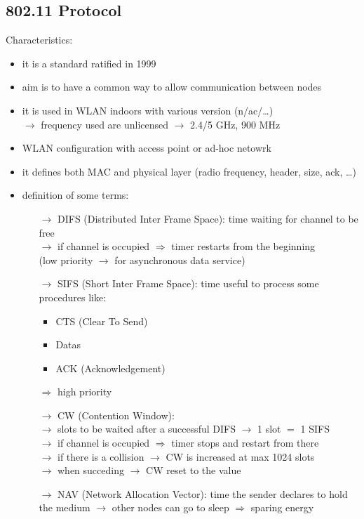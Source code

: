\subsection{802.11 Protocol}
Characteristics:
\begin{itemize}
    \item it is a standard ratified in 1999
    \item aim is to have a common way to allow communication between nodes
    \item it is used in WLAN indoors with various version (n/ac/\dots)\\
    $\rightarrow$ frequency used are unlicensed $\rightarrow$ 2.4/5 GHz, 900 MHz
    \item WLAN configuration with access point or ad-hoc netowrk
    \item it defines both MAC and physical layer (radio frequency, header, size, ack, \dots)
    \item definition of some terms:
    \begin{itemize}
        \item[$\rightarrow$] DIFS (Distributed Inter Frame Space): time waiting for channel to be free\\
        $\rightarrow$ if channel is occupied $\Rightarrow$ timer restarts from the beginning\\
        (low priority $\rightarrow$ for asynchronous data service)
        \item[$\rightarrow$] SIFS (Short Inter Frame Space): time useful to process some procedures like:
        \begin{itemize}
            \item CTS (Clear To Send)
            \item Datas
            \item ACK (Acknowledgement)
        \end{itemize}
        $\Rightarrow$ high priority
        \item[$\rightarrow$] CW (Contention Window):\\
        $\rightarrow$ slots to be waited after a successful DIFS
        $\rightarrow$ 1 slot $=$ 1 SIFS\\$\rightarrow$ if channel is occupied
        $\Rightarrow$ timer stops and restart from there\\
        $\rightarrow$ if there is a collision $\rightarrow$ CW is increased at max 1024 slots\\
        $\rightarrow$ when succeding $\rightarrow$ CW reset to the value
        \item[$\rightarrow$] NAV (Network Allocation Vector): time the sender declares to hold\\the medium $\rightarrow$ other
        nodes can go to sleep $\Rightarrow$ sparing energy
    \end{itemize}
\end{itemize}
